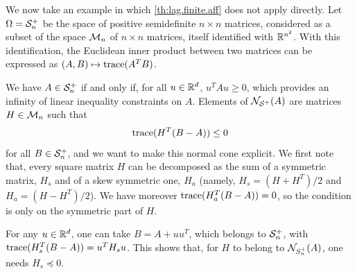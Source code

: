 We now take an example in which \cref{th:lag.finite.aff} does not apply directly. Let $\Omega = {\mathcal S}_n^+$ be the space of positive semidefinite $n\times n$  matrices, considered as a subset of the space ${\mathcal M}_n$ of $n\times n$ matrices, itself identified with ${\mathbb{R}}^{n^2}$. With this identification, the Euclidean inner product between two matrices can be expressed as  $(A,B) \mapsto {\mathrm{trace}}(A^TB)$.

We have $A\in {\mathcal S}_n^+$ if and only if, for all $u\in {\mathbb{R}}^d$, 
$u^T A u \geq 0$, which provides an infinity of linear inequality constraints on $A$. Elements of ${\mathcal N}_{{\mathcal S}^+}(A)$ are matrices $H\in {\mathcal M}_n$ such that
\[
{\mathrm{trace}}(H^T (B-A)) \leq 0
\]
for all $B\in {\mathcal S}_n^+$, and we want to make this normal cone explicit. We first note that, every square matrix $H$ can be decomposed as the sum of a symmetric matrix, $H_s$ and of a skew symmetric one, $H_a$ (namely, $H_s = (H+H^T)/2$ and $H_a = (H-H^T)/2$). We have moreover 
${\mathrm{trace}}(H_a^T (B-A)) = 0$, so the condition is only on the symmetric part of $H$.

For any $u\in {\mathbb{R}}^d$, one can take $B = A + uu^T$, which belongs to ${\mathcal S}^+_n$, with
${\mathrm{trace}}(H_s^T(B-A)) = u^T H_s u$. This shows that, for $H$ to belong to ${\mathcal N}_{S^+_n}(A)$, one needs $H_s \preceq 0$. 


